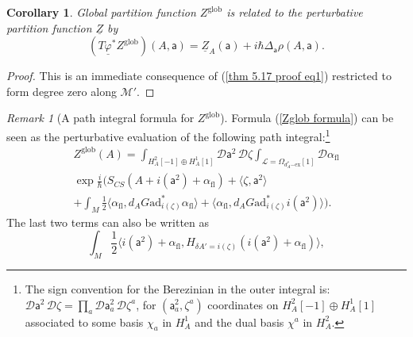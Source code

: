 \documentclass[11pt,a4paper]{amsart}
\theoremstyle{plain} %
\newtheorem{cor}[thm]{Corollary}
\theoremstyle{definition}
\theoremstyle{remark}
\newtheorem{rem}[thm]{Remark}
\newcommand{\mr}{\mathrm}
\newcommand{\sfa}{\mathsf{a}}
\newcommand{\M}{\mathcal{M}}
\newcommand{\mc}{\mathcal}
\newcommand{\ul}{\underline}
\begin{document}
\begin{cor}\label{cor: Tphi^* Zglob=Z+Delta(...)}
    Global partition function $Z^\mr{glob}$ is related to the perturbative partition function $\ul{Z}$ by
    \begin{equation}
        (T\ul\varphi^* Z^\mr{glob})(A,\sfa)=\ul{Z}_A(\sfa)+i\hbar\Delta_\sfa\rho(A,\sfa).
    \end{equation}
\end{cor}
\begin{proof}
    This is an immediate consequence of (\ref{thm 5.17 proof eq1}) restricted to form degree zero along $\M'$.
\end{proof}

\begin{rem}[A path integral formula for $Z^\mr{glob}$]\label{rem: PI formula for Zglob}
    Formula (\ref{Zglob formula}) can be seen as the perturbative evaluation of the following path integral:\footnote{
    The sign convention for the Berezinian in the outer integral is: $\mc{D}\sfa^2\,\mc{D}\zeta=\prod_a \mc{D}\sfa^2_a\,\mc{D}\zeta^a$, for $(\sfa^2_a,\zeta^a)$ coordinates on $H^2_A[-1]\oplus H^1_A[1]$ associated to some basis $\chi_a$ in $H^1_A$ and the dual basis $\chi^a$ in $H^2_A$.
    }
\begin{multline}\label{Zglob path integral formula}
    Z^\mr{glob}(A)=%
    \int_{H^2_A[-1]\oplus H^1_A[1]
    }
    \mc{D} \sfa^2\, \mc{D} \zeta 
    \int_{\mc{L}=\Omega_{d_A^*\mr{-ex}}[1]} \mc{D} \alpha_\mr{fl}\\
    \exp \frac{i}{\hbar}\Bigg(S_{CS}(A+i(\sfa^2)+\alpha_\mr{fl})+
    \langle \zeta,\sfa^2\rangle 
    \\
    + \int_M \frac12 \langle \alpha_\mr{fl},d_A G \mr{ad}^*_{i(\zeta)} \alpha_\mr{fl} \rangle +\langle \alpha_\mr{fl},d_A G \mr{ad}^*_{i(\zeta)} i(\sfa^2) \rangle\Bigg).
\end{multline}
The last two terms can also be written as 
\begin{equation}\label{Zglob interaction vertex}
\int_M \frac12 \langle i(\sfa^2)+\alpha_\mr{fl}, H_{\delta A'=i(\zeta)}(i(\sfa^2)+\alpha_\mr{fl}) \rangle,
\end{equation}

\end{rem}
\end{document}
